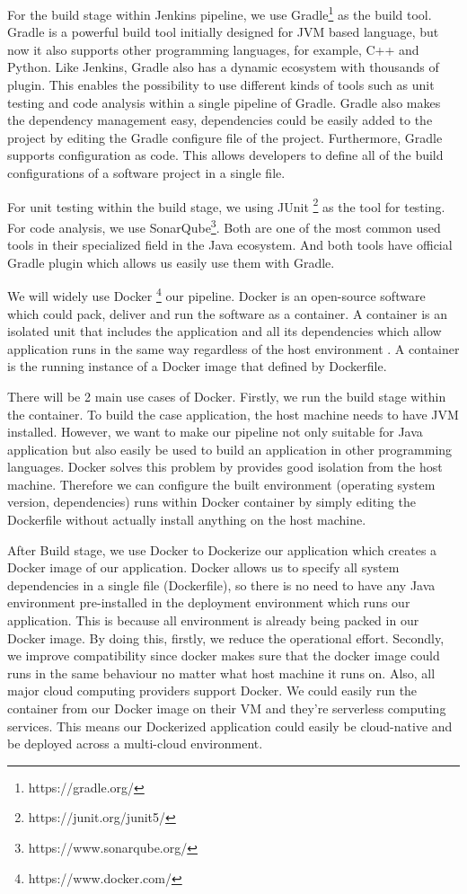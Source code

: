 \par
For the build stage within Jenkins pipeline, we use Gradle\footnote{https://gradle.org/} as the build tool. 
Gradle is a powerful build tool initially designed for JVM based language, but now it also supports other programming languages, for example, C++ and Python. Like Jenkins, Gradle also has a dynamic ecosystem with thousands of plugin. This enables the possibility to use different kinds of tools such as unit testing and code analysis within a single pipeline of Gradle. Gradle also makes the dependency management easy, dependencies could be easily added to the project by editing the Gradle configure file of the project. Furthermore, Gradle supports configuration as code. This allows developers to define all of the build configurations of a software project in a single file.
\par
For unit testing within the build stage, we using JUnit \footnote{https://junit.org/junit5/} as the tool for testing. For code analysis, we use SonarQube\footnote{https://www.sonarqube.org/}. Both are one of the most common used tools in their specialized field in the Java ecosystem. And both tools have official Gradle plugin which allows us easily use them with Gradle. 
\par
We will widely use Docker \footnote{https://www.docker.com/} our pipeline.  Docker is an open-source software which could pack, deliver and run the software as a container. A container is an isolated unit that includes the application and all its dependencies which allow application runs in the same way regardless of the host environment \cite{WhatisaC60:online}. A container is the running instance of a Docker image that defined by Dockerfile.
\par    
There will be 2 main use cases of Docker. Firstly, we run the build stage within the container. To build the case application, the host machine needs to have JVM installed. However, we want to make our pipeline not only suitable for Java application but also easily be used to build an application in other programming languages. Docker solves this problem by provides good isolation from the host machine. Therefore we can configure the built environment (operating system version, dependencies) runs within Docker container by simply editing the Dockerfile without actually install anything on the host machine.
\par
After Build stage, we use Docker to Dockerize our application which creates a Docker image of our application.
Docker allows us to specify all system dependencies in a single file (Dockerfile), so there is no need to have any Java environment pre-installed in the deployment environment which runs our application. This is because all environment is already being packed in our Docker image. By doing this, firstly, we reduce the operational effort. Secondly, we improve compatibility since docker makes sure that the docker image could runs in the same behaviour no matter what host machine it runs on. Also, all major cloud computing providers support Docker. We could easily run the container from our Docker image on their VM and they're serverless computing services. This means our Dockerized application could easily be cloud-native and be deployed across a multi-cloud environment.

